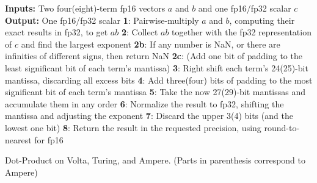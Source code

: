 \begin{algorithm}[t]
\footnotesize
\begin{algorithmic}
\State  \textbf{Inputs:} Two four(eight)-term fp16 vectors $a$ and $b$ and one fp16/fp32 scalar $c$
\State  \textbf{Output:} One fp16/fp32 scalar
\State \textbf{1}: Pairwise-multiply $a$ and $b$, computing their exact results in fp32, to get $ab$
\State \textbf{2}: Collect $ab$ together with the fp32 representation of $c$ and find the largest exponent
\State \textbf{2b}: If any number is NaN, or there are infinities of different signs, then return NaN
\State \textbf{2c}: (Add one bit of padding to the least significant bit of each term's mantissa)
\State \textbf{3}: Right shift each term's 24(25)-bit mantissa, discarding all excess bits
\State \textbf{4}: Add three(four) bits of padding to the most significant bit of each term's mantissa
\State \textbf{5}: Take the now 27(29)-bit mantissas and accumulate them in any order
\State \textbf{6}: Normalize the result to fp32, shifting the mantissa and adjusting the exponent
\State \textbf{7}: Discard the upper 3(4) bits (and the lowest one bit)
\State \textbf{8}: Return the result in the requested precision, using round-to-nearest for fp16
\end{algorithmic}
\caption{Dot-Product on Volta, Turing, and Ampere. (Parts in parenthesis correspond to Ampere)}
\label{alg:mma}
\end{algorithm}


